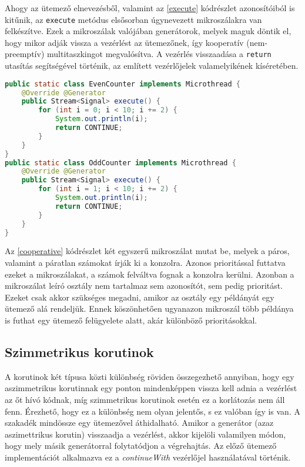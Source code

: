 Ahogy az ütemező elnevezésből, valamint az \ref{execute} kódrészlet azonosítóiból is kitűnik, az \texttt{execute} metódus elsősorban úgynevezett mikroszálakra van felkészítve. Ezek a mikroszálak valójában generátorok, melyek maguk döntik el, hogy mikor adják vissza a vezérlést az ütemezőnek, így kooperatív (nem-preemptív) multitaszkingot megvalósítva. A vezérlés visszaadása a \texttt{return} utasítás segítségével történik, az említett vezérlőjelek valamelyikének kíséretében.

\begin{lstlisting}[language=Java, caption={Kooperatív mikroszálak}, escapechar=!, captionpos=b, aboveskip=1em, label=cooperative]
public static class EvenCounter implements Microthread {
    @Override @Generator
    public Stream<Signal> execute() {
        for (int i = 0; i < 10; i += 2) {
            System.out.println(i);
            return CONTINUE;
        }
    }
}
public static class OddCounter implements Microthread {
    @Override @Generator
    public Stream<Signal> execute() {
        for (int i = 1; i < 10; i += 2) {
            System.out.println(i);
            return CONTINUE;
        }
    }
}
\end{lstlisting} 

Az \ref{cooperative} kódrészlet két egyszerű mikroszálat mutat be, melyek a páros, valamint a páratlan számokat írják ki a konzolra. Azonos prioritással futtatva ezeket a mikroszálakat, a számok felváltva fognak a konzolra kerülni. Azonban a mikroszálat leíró osztály nem tartalmaz sem azonosítót, sem pedig prioritást. Ezeket csak akkor szükséges megadni, amikor az osztály egy példányát egy ütemező alá rendeljük. Ennek köszönhetően ugyanazon mikroszál több példánya is futhat egy ütemező felügyelete alatt, akár különböző prioritásokkal.

\subsection{Szimmetrikus korutinok}

A korutinok két típusa közti különbség röviden összegezhető annyiban, hogy egy aszimmetrikus korutinnak egy ponton mindenképpen vissza kell adnia a vezérlést az őt hívó kódnak, míg szimmetrikus korutinok esetén ez a korlátozás nem áll fenn. Érezhető, hogy ez a különbség nem olyan jelentős, s ez valóban így is van. A szakadék mindössze egy ütemezővel áthidalható.  Amikor a generátor (azaz aszimettrikus korutin) visszaadja a vezérlést, akkor kijelöli valamilyen módon, hogy mely másik generátorral folytatódjon a végrehajtás. Az előző ütemező implementációt alkalmazva ez a \textit{continueWith} vezérlőjel használatával történik.

